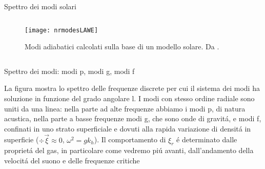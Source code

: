 \documentclass[10pt,xcolor={usenames},fleqn,mathserif,serif]{beamer}
\begin{document}
\begin{frame}{Spettro dei modi solari}


\begin{columns}

\begin{column}{0.45\textwidth}

\begin{figure}[!ht]


\texttt{[image: nrmodesLAWE]}
\caption{Modi adiabatici calcolati sulla base di un modello solare. Da \cite{chr02helioseismology}.}\label{fig:nrmodesLAWE}

\end{figure}

\end{column}

\begin{column}{0.45\textwidth}

\end{column}

\end{columns}


\end{frame}

\begin{wordonframe}{Spettro dei modi: modi p, modi g, modi f}

La figura mostra lo spettro delle frequenze discrete per cui il sistema dei modi ha soluzione in funzione del grado angolare l. I modi con stesso ordine radiale sono uniti da una linea: nella parte ad alte frequenze abbiamo i modi p, di natura acustica, nella parte a basse frequenze modi g, che sono onde di gravit\'a, e modi f, confinati in uno strato superficiale e dovuti alla rapida variazione di densit\'a in superficie ($\div{\vec{\xi}}\approx0$, $\omega^2=gk_h$). Il comportamento di $\xi_r$ \'e determinato dalle propriet\'a del gas, in particolare come vedremo pi\'u avanti, dall'andamento della velocit\'a del suono e delle frequenze critiche

\end{wordonframe}
\end{document}
